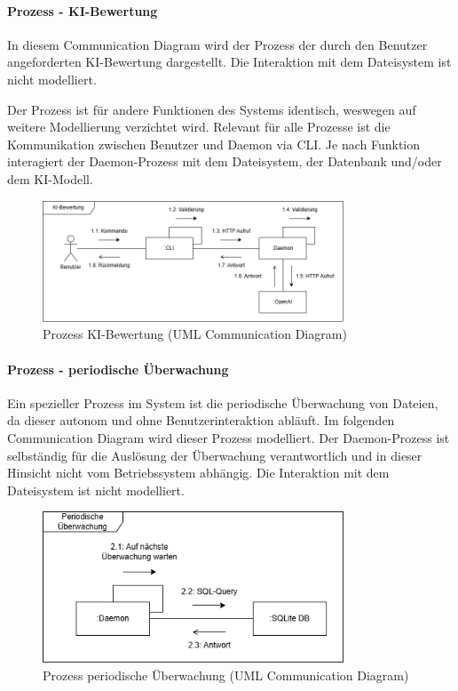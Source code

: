 \documentclass[a4paper,12pt]{report}
\begin{document}
    \paragraph*{Prozess - KI-Bewertung}
    In diesem Communication Diagram wird der Prozess der durch den Benutzer angeforderten KI-Bewertung dargestellt.
    Die Interaktion mit dem Dateisystem ist nicht modelliert.

    Der Prozess ist für andere Funktionen des Systems identisch, weswegen auf weitere Modellierung verzichtet wird.
    Relevant für alle Prozesse ist die Kommunikation zwischen Benutzer und Daemon via CLI\@.
    Je nach Funktion interagiert der Daemon-Prozess mit dem Dateisystem, der Datenbank und/oder dem KI-Modell.

    \begin{figure}[h]
        \centering
        \includegraphics[width=0.8\textwidth]{assets/communication}
        \caption{Prozess KI-Bewertung (UML Communication Diagram)}
        \label{fig:communication}
    \end{figure}
    \clearpage

    \paragraph*{Prozess - periodische Überwachung}
    Ein spezieller Prozess im System ist die periodische Überwachung von Dateien, da dieser autonom und ohne Benutzerinteraktion abläuft.
    Im folgenden Communication Diagram wird dieser Prozess modelliert.
    Der Daemon-Prozess ist selbständig für die Auslösung der Überwachung verantwortlich und in dieser Hinsicht nicht vom Betriebssystem abhängig.
    Die Interaktion mit dem Dateisystem ist nicht modelliert.

    \begin{figure}[h]
        \centering
        \includegraphics[width=0.8\textwidth]{assets/communication-scheduler}
        \caption{Prozess periodische Überwachung (UML Communication Diagram)}
        \label{fig:communication-scheduler}
    \end{figure}
\end{document}
